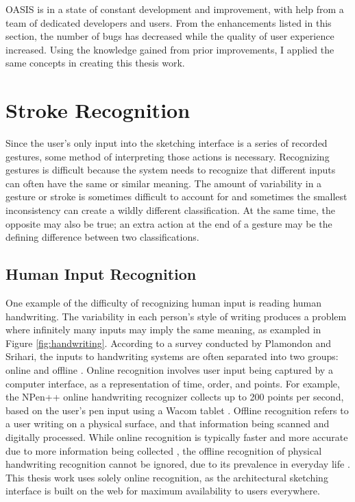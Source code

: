 OASIS is in a state of constant development and improvement, with help from a team of dedicated developers and users. From the enhancements listed in this section, the number of bugs has decreased while the quality of user experience increased. Using the knowledge gained from prior improvements, I applied the same concepts in creating this thesis work. \\

\section{Stroke Recognition}

Since the user's only input into the sketching interface is a series of recorded gestures, some method of interpreting those actions is necessary. Recognizing gestures is difficult because the system needs to recognize that different inputs can often have the same or similar meaning. The amount of variability in a gesture or stroke is sometimes difficult to account for and sometimes the smallest inconsistency can create a wildly different classification. At the same time, the opposite may also be true; an extra action at the end of a gesture may be the defining difference between two classifications. \\

\subsection{Human Input Recognition}
One example of the difficulty of recognizing human input is reading human handwriting. The variability in each person's style of writing produces a problem where infinitely many inputs may imply the same meaning, as exampled in Figure \ref{fig:handwriting}. According to a survey conducted by Plamondon and Srihari, the inputs to handwriting systems are often separated into two groups: online and offline \cite{handwritingrec}. Online recognition involves user input being captured by a computer interface, as a representation of time, order, and points. For example, the NPen++ online handwriting recognizer collects up to 200 points per second, based on the user's pen input using a Wacom tablet \cite{npen}. Offline recognition refers to a user writing on a physical surface, and that information being scanned and  digitally processed. While online recognition is typically faster and more accurate due to more information being collected \cite{neural2011}, the offline recognition of physical handwriting recognition cannot be ignored, due to its prevalence in everyday life \cite{handwritingrec}. This thesis work uses solely online recognition, as the architectural sketching interface is built on the web for maximum availability to users everywhere.

